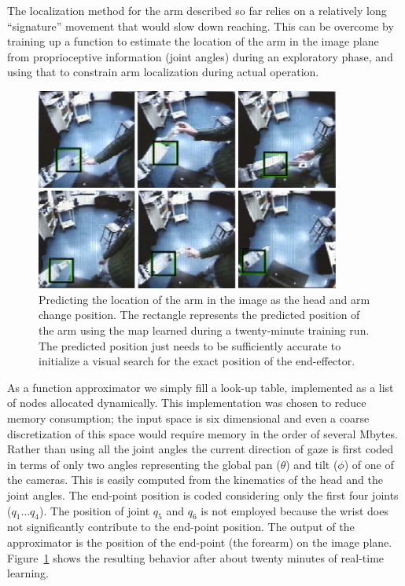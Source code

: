 The localization method for the arm described so far relies on a
relatively long ``signature'' movement that would slow down reaching.
This can be overcome by training up a function to estimate the
location of the arm in the image plane from proprioceptive information
(joint angles) during an exploratory phase, and using that to 
constrain arm localization during actual operation.

\begin{figure}[tbh]
\begin{center}
\includegraphics[width=10cm]{predict-position.eps}
\caption{ 
\label{fig:predict-position}
%
Predicting the location of the arm in the image as the head and arm
change position. The rectangle represents the predicted position of
the arm using the map learned during a twenty-minute training run.
The predicted position just needs to be sufficiently accurate to
initialize a visual search for the exact position of the end-effector.
%
}
\end{center}
\end{figure}


As a function approximator we simply fill a look-up table, implemented
as a list of nodes allocated dynamically. This implementation
was chosen to reduce memory consumption; the input space is six
dimensional and even a coarse discretization of this space would require
memory in the order of several Mbytes. Rather than using all the joint angles
the current direction of gaze is first coded in terms of only two angles
representing the global pan ($\theta$) and tilt ($\phi$) of one of the cameras.
This is easily computed from the kinematics of the head and the joint angles.
The end-point position is coded considering only the first four joints 
($q_1\ldots q_4$). The position of joint $q_5$ and $q_6$ is not employed because 
the wrist does not significantly contribute to the end-point position.
The output of the approximator is the position of the end-point (the forearm) on
the image plane. Figure~\ref{fig:predict-position} shows the resulting behavior
after about twenty minutes of real-time learning. 

